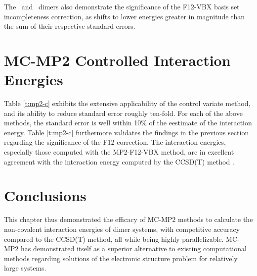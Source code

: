 The \hho\ and \ch\ dimers also demonstrate the significance of the F12-VBX
basis set incompleteness correction, as shifts to lower energies greater in
magnitude than the sum of their respective standard errors.

\section{MC-MP2 Controlled Interaction Energies}



Table \ref{t:mp2-c} exhibits the extensive applicability of the control variate
method, and its ability to reduce standard error roughly ten-fold. For each of
the above methods, the standard error is well within 10\% of the eestimate of
the interaction energy. Table \ref{t:mp2-c} furthermore validates the findings
in the previous section regarding the significance of the F12 correction. The
interaction energies, especially those computed with the MP2-F12-VBX method, are
in excellent agreement with the interaction energy computed by the CCSD(T)
method \cite{s22-ccsdt}.

\section{Conclusions}

This chapter thus demonstrated the efficacy of MC-MP2 methods to calculate the
non-covalent interaction energies of dimer systems, with competitive accuracy
compared to the CCSD(T) method, all while being highly parallelizable. MC-MP2
has demonstrated itself as a superior alternative to existing computational
methods regarding solutions of the electronic structure problem for relatively
large systems.
